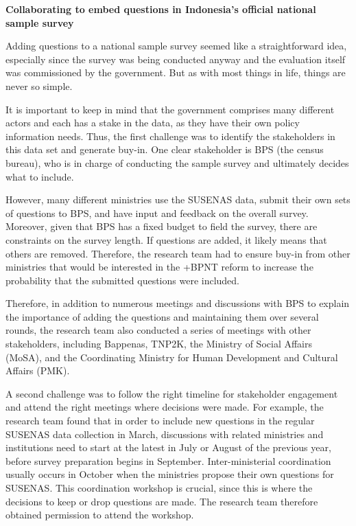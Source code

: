 \documentclass[
]{WileySix}
\begin{document}
\begin{bbox}
\begin{bbox}

\textbf{Collaborating to embed questions in Indonesia's official national sample survey}

Adding questions to a national sample survey seemed like a straightforward idea, especially since the survey was being conducted anyway and the evaluation itself was commissioned by the government. But as with most things in life, things are never so simple.

It is important to keep in mind that the government comprises many different actors and each has a stake in the data, as they have their own policy information needs. Thus, the first challenge was to identify the stakeholders in this data set and generate buy-in. One clear stakeholder is BPS (the census bureau), who is in charge of conducting the sample survey and ultimately decides what to include.

However, many different ministries use the SUSENAS data, submit their own sets of questions to BPS, and have input and feedback on the overall survey. Moreover, given that BPS has a fixed budget to field the survey, there are constraints on the survey length. If questions are added, it likely means that others are removed. Therefore, the research team had to ensure buy-in from other ministries that would be interested in the +BPNT\textbar{} reform to increase the probability that the submitted questions were included.

Therefore, in addition to numerous meetings and discussions with BPS to explain the importance of adding the questions and maintaining them over several rounds, the research team also conducted a series of meetings with other stakeholders, including Bappenas, TNP2K, the Ministry of Social Affairs (MoSA), and the Coordinating Ministry for Human Development and Cultural Affairs (PMK).

A second challenge was to follow the right timeline for stakeholder engagement and attend the right meetings where decisions were made. For example, the research team found that in order to include new questions in the regular SUSENAS data collection in March, discussions with related ministries and institutions need to start at the latest in July or August of the previous year, before survey preparation begins in September. Inter-ministerial coordination usually occurs in October when the ministries propose their own questions for SUSENAS. This coordination workshop is crucial, since this is where the decisions to keep or drop questions are made. The research team therefore obtained permission to attend the workshop.


\end{bbox}
\end{bbox}
\end{document}
